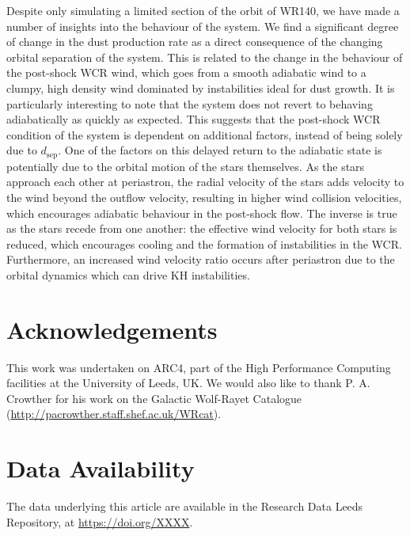 \documentclass[fleqn,usenatbib]{mnras}
\newcommand{\rms}[1]{\ensuremath{_{\text{#1}}}}
\begin{document}
Despite only simulating a limited section of the orbit of WR140, we have made a number of insights into the behaviour of the system.
We find a significant degree of change in the dust production rate as a direct consequence of the changing orbital separation of the system.
This is related to the change in the behaviour of the post-shock WCR wind, which goes from a smooth adiabatic wind to a clumpy, high density wind dominated by instabilities ideal for dust growth.
It is particularly interesting to note that the system does not revert to behaving adiabatically as quickly as expected.
This suggests that the post-shock WCR condition of the system is dependent on additional factors, instead of being solely due to $d\rms{sep}$.
One of the factors on this delayed return to the adiabatic state is potentially due to the orbital motion of the stars themselves.
As the stars approach each other at periastron, the radial velocity of the stars adds velocity to the wind beyond the outflow velocity, resulting in higher wind collision velocities, which encourages adiabatic behaviour in the post-shock flow.
The inverse is true as the stars recede from one another: the effective wind velocity for both stars is reduced, which encourages cooling and the formation of instabilities in the WCR.
Furthermore, an increased wind velocity ratio occurs after periastron due to the orbital dynamics which can drive KH instabilities.


\section*{Acknowledgements}

This work was undertaken on ARC4, part of the High Performance Computing facilities at the University of Leeds, UK.
We would also like to thank P. A. Crowther for his work on the Galactic Wolf-Rayet Catalogue (\url{http://pacrowther.staff.shef.ac.uk/WRcat}).

\section*{Data Availability}
The data underlying this article are available in the Research Data Leeds Repository, at \url{https://doi.org/XXXX}.





\bsp	%
\label{lastpage}
\end{document}
